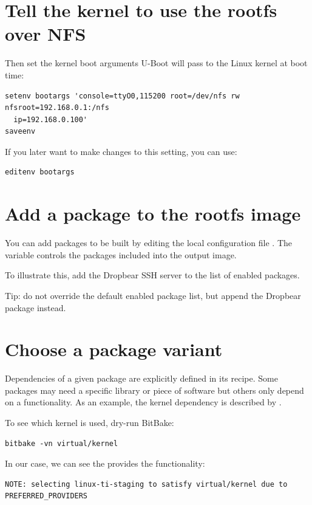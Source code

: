 \section{Tell the kernel to use the rootfs over NFS}

Then set the kernel boot arguments U-Boot will pass to the Linux kernel at boot
time:
\begin{verbatim}
setenv bootargs 'console=ttyO0,115200 root=/dev/nfs rw nfsroot=192.168.0.1:/nfs
  ip=192.168.0.100'
saveenv
\end{verbatim}

If you later want to make changes to this setting, you can use:
\begin{verbatim}
editenv bootargs
\end{verbatim}

\section{Add a package to the rootfs image}

You can add packages to be built by editing the local configuration file
. The  variable controls the
packages included into the output image.

To illustrate this, add the Dropbear SSH server to the list of enabled
packages.

Tip: do not override the default enabled package list, but append the Dropbear
package instead.

\section{Choose a package variant}

Dependencies of a given package are explicitly defined in its recipe.
Some packages may need a specific library or piece of software but
others only depend on a functionality. As an example, the kernel
dependency is described by .

To see which kernel is used, dry-run BitBake:
\begin{verbatim}
bitbake -vn virtual/kernel
\end{verbatim}

In our case, we can see the  provides the
 functionality:
\small
\begin{verbatim}
NOTE: selecting linux-ti-staging to satisfy virtual/kernel due to PREFERRED_PROVIDERS
\end{verbatim}
\normalsize

